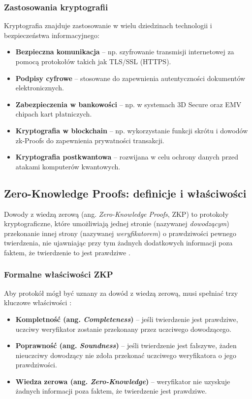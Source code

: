\documentclass{article}
\begin{document}
\subsubsection{Zastosowania kryptografii}
Kryptografia znajduje zastosowanie w wielu dziedzinach technologii i bezpieczeństwa informacyjnego:

\begin{itemize}
    \item \textbf{Bezpieczna komunikacja} – np. szyfrowanie transmisji internetowej za pomocą protokołów takich jak TLS/SSL (HTTPS).
    \item \textbf{Podpisy cyfrowe} – stosowane do zapewnienia autentyczności dokumentów elektronicznych.
    \item \textbf{Zabezpieczenia w bankowości} – np. w systemach 3D Secure oraz EMV chipach kart płatniczych.
    \item \textbf{Kryptografia w blockchain} – np. wykorzystanie funkcji skrótu i dowodów zk-Proofs do zapewnienia prywatności transakcji.
    \item \textbf{Kryptografia postkwantowa} – rozwijana w celu ochrony danych przed atakami komputerów kwantowych.
\end{itemize}

\subsection{Zero-Knowledge Proofs: definicje i właściwości}

Dowody z wiedzą zerową (ang. \textit{Zero-Knowledge Proofs}, ZKP) to protokoły kryptograficzne, które umożliwiają jednej stronie (nazywanej \textit{dowodzącym}) 
przekonanie innej strony (nazywanej \textit{weryfikatorem}) o prawdziwości pewnego twierdzenia, nie ujawniając przy tym żadnych dodatkowych informacji poza faktem, 
że twierdzenie to jest prawdziwe \cite{Karbowski2015}.

\subsubsection{Formalne właściwości ZKP} 
Aby protokół mógł być uznany za dowód z wiedzą zerową, musi spełniać trzy kluczowe właściwości \cite{zkp_chainlink}:

\begin{itemize}
    \item \textbf{Kompletność (ang. \textit{Completeness})} – jeśli twierdzenie jest prawdziwe, uczciwy weryfikator zostanie przekonany przez uczciwego dowodzącego.
    \item \textbf{Poprawność (ang. \textit{Soundness})} – jeśli twierdzenie jest fałszywe, żaden nieuczciwy dowodzący nie zdoła przekonać uczciwego weryfikatora o jego prawdziwości.
    \item \textbf{Wiedza zerowa (ang. \textit{Zero-Knowledge})} – weryfikator nie uzyskuje żadnych informacji poza faktem, że twierdzenie jest prawdziwe.
\end{itemize}
\end{document}
